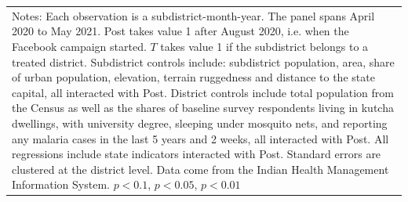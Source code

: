 {{\begin{tabular}{l*{6}{c}}
\hline\hline
\multicolumn{7}{p{0.85\linewidth}}{\scriptsize Notes: Each observation is a subdistrict-month-year. The panel spans April 2020 to May 2021. Post takes value 1 after August 2020, i.e. when the Facebook campaign started. \(T\) takes value 1 if the subdistrict belongs to a treated district. Subdistrict controls include: subdistrict population, area, share of urban population, elevation, terrain ruggedness and distance to the state capital, all interacted with Post. District controls include total population from the Census as well as the shares of baseline survey respondents living in kutcha dwellings, with university degree, sleeping under mosquito nets, and reporting any malaria cases in the last 5 years and 2 weeks, all interacted with Post. All regressions include state indicators interacted with Post. Standard errors are clustered at the district level. Data come from the Indian Health Management Information System. \sym{*} \(p<0.1\), \sym{**} \(p<0.05\), \sym{***} \(p<0.01\)}\\
\end{tabular}
}%

}
